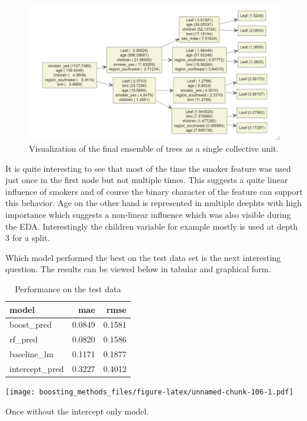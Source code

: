 \documentclass[
]{book}
\begin{document}
\begin{figure}

{\centering \includegraphics[width=0.7\linewidth]{_pictures/ins_multitree_xgb} 

}

\caption{Visualization of the final ensemble of trees as a single collective unit.}\label{fig:insmultitree}
\end{figure}

It is quite interesting to see that most of the time the smoker feature was used just once in the first node but not multiple times. This suggests a quite linear influence of smokers and of course the binary character of the feature can support this behavior. Age on the other hand is represented in multiple deephts with high importance which suggests a non-linear influence which was also visible during the EDA. Interestingly the children variable for example mostly is used at depth 3 for a split.

Which model performed the best on the test data set is the next interesting question. The results can be viewed below in tabular and graphical form.

\begin{table}

\caption{\label{tab:perfIns}Performance on the test data}
\centering
\begin{tabular}[t]{lrr}
\toprule
model & mae & rmse\\
\midrule
boost\_pred & 0.0849 & 0.1581\\
rf\_pred & 0.0820 & 0.1586\\
baseline\_lm & 0.1171 & 0.1877\\
intercept\_pred & 0.3227 & 0.4012\\
\bottomrule
\end{tabular}
\end{table}

\texttt{[image: boosting\_methods\_files/figure-latex/unnamed-chunk-106-1.pdf]}

Once without the intercept only model.
\end{document}
